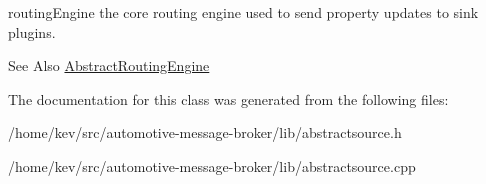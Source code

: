 routing\-Engine the core routing engine used to send property updates to sink plugins. 

\begin{DoxySeeAlso}{See Also}
\hyperlink{classAbstractRoutingEngine}{Abstract\-Routing\-Engine} 
\end{DoxySeeAlso}


The documentation for this class was generated from the following files\-:\begin{DoxyCompactItemize}
\item 
/home/kev/src/automotive-\/message-\/broker/lib/abstractsource.\-h\item 
/home/kev/src/automotive-\/message-\/broker/lib/abstractsource.\-cpp\end{DoxyCompactItemize}
